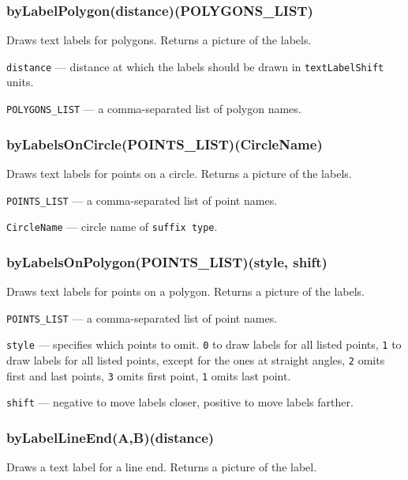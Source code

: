 \documentclass{ltxdoc}
\begin{document}
\subsubsection{byLabelPolygon(distance)(POLYGONS\_LIST)}\label{byLabelPolygon}
	
	Draws text labels for polygons. Returns a picture of the labels.
	
	\texttt{distance} — distance at which the labels should be drawn in \texttt{textLabelShift} units.
	
	\texttt{POLYGONS\_LIST} — a comma-separated list of polygon names.


\subsubsection{byLabelsOnCircle(POINTS\_LIST)(CircleName)}\label{byLabelsOnCircle}
	
	Draws text labels for points on a circle. Returns a picture of the labels.
	
	\texttt{POINTS\_LIST} — a comma-separated list of point names.
	
	\texttt{CircleName} — circle name of \texttt{suffix type}.

\subsubsection{byLabelsOnPolygon(POINTS\_LIST)(style, shift)}\label{byLabelsOnPolygon}
	
	Draws text labels for points on a polygon. Returns a picture of the labels.
	
	\texttt{POINTS\_LIST} — a comma-separated list of point names.
	
	\texttt{style} — specifies which points to omit. \texttt{0} to draw labels for all listed points, \texttt{1} to draw labels for all listed points, except for the ones at straight angles, \texttt{2} omits first and last points, \texttt{3} omits first point, \texttt{1} omits last point.
	
	\texttt{shift} — negative to move labels closer, positive to move labels farther.

\subsubsection{byLabelLineEnd(A,B)(distance)}\label{byLabelLineEnd}
	
	Draws a text label for a line end. Returns a picture of the label.
	
\end{document}
